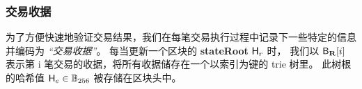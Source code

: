 \subsubsection{交易收据}

为了方便快速地验证交易结果，我们在每笔交易执行过程中记录下一些特定的信息并编码为 \emph{“交易收据”}。
每当更新一个区块的 {\bf stateRoot} $\textsf{H}_r$ 时，
我们以 $\textsf{B}_{\mathbf{R}}[i]$ 表示第 i 笔交易的收据，将所有收据储存在一个以索引为键的 trie 树里。
此树根的哈希值 $\textsf{H}_e\in\mathbb{B}_{256}$ 被存储在区块头中。

